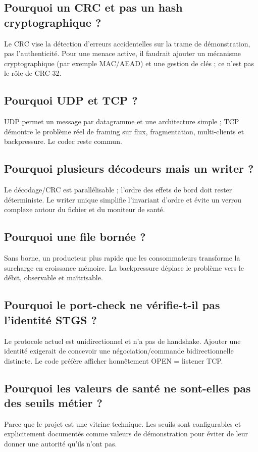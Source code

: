 \documentclass[11pt,a4paper]{article}
\begin{document}
\subsection{Pourquoi un CRC et pas un hash cryptographique ?}
Le CRC vise la détection d'erreurs accidentelles sur la trame de démonstration, pas l'authenticité. Pour une menace active, il faudrait ajouter un mécanisme cryptographique (par exemple MAC/AEAD) et une gestion de clés ; ce n'est pas le rôle de CRC-32.

\subsection{Pourquoi UDP et TCP ?}
UDP permet un message par datagramme et une architecture simple ; TCP démontre le problème réel de framing sur flux, fragmentation, multi-clients et backpressure. Le codec reste commun.

\subsection{Pourquoi plusieurs décodeurs mais un writer ?}
Le décodage/CRC est parallélisable ; l'ordre des effets de bord doit rester déterministe. Le writer unique simplifie l'invariant d'ordre et évite un verrou complexe autour du fichier et du moniteur de santé.

\subsection{Pourquoi une file bornée ?}
Sans borne, un producteur plus rapide que les consommateurs transforme la surcharge en croissance mémoire. La backpressure déplace le problème vers le débit, observable et maîtrisable.

\subsection{Pourquoi le port-check ne vérifie-t-il pas l'identité STGS ?}
Le protocole actuel est unidirectionnel et n'a pas de handshake. Ajouter une identité exigerait de concevoir une négociation/commande bidirectionnelle distincte. Le code préfère afficher honnêtement OPEN = listener TCP.

\subsection{Pourquoi les valeurs de santé ne sont-elles pas des seuils métier ?}
Parce que le projet est une vitrine technique. Les seuils sont configurables et explicitement documentés comme valeurs de démonstration pour éviter de leur donner une autorité qu'ils n'ont pas.
\end{document}
